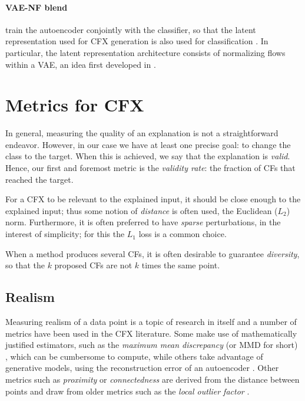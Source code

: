 \documentclass[../main.tex]{subfiles}
\begin{document}
\paragraph{VAE-NF blend}

\citeauthor{zhangInterpretable2022} train the autoencoder conjointly with the classifier, so that the latent representation used for CFX generation is also used for classification \cite{zhangInterpretable2022}.
In particular, the latent representation architecture consists of normalizing flows within a VAE, an idea first developed in \cite{rezendeVariational2015}.

\section{Metrics for CFX}

In general, measuring the quality of an explanation is not a straightforward endeavor.
However, in our case we have at least one precise goal: to change the class to the target.
When this is achieved, we say that the explanation is \emph{valid}.
Hence, our first and foremost metric is the \emph{validity rate}: the fraction of CFs that reached the target.

For a CFX to be relevant to the explained input, it should be close enough to the explained input; thus some notion of \emph{distance} is often used, \eg{} the Euclidean ($L_2$) norm.
Furthermore, it is often preferred to have \emph{sparse} perturbations, in the interest of simplicity; for this the $L_1$ loss is a common choice. \citenote{}


When a method produces several CFs, it is often desirable to guarantee \emph{diversity}, so that the $k$ proposed CFs are not $k$ times the same point.

\subsection{Realism}

Measuring realism of a data point is a topic of research in itself and a number of metrics have been used in the CFX literature.
Some make use of mathematically justified estimators, such as the \emph{maximum mean discrepancy} (or MMD for short) \cite{zhangInterpretable2022}, which can be cumbersome to compute, while others take advantage of generative models, \eg{} using the reconstruction error of an autoencoder \cite{vanlooverenInterpretable2021}.
Other metrics such as \emph{proximity} or \emph{connectedness} \cite{laugelIssues2019} are derived from the distance between points and draw from older metrics such as the \emph{local outlier factor} \cite{breunigLOF2000}.
\end{document}
